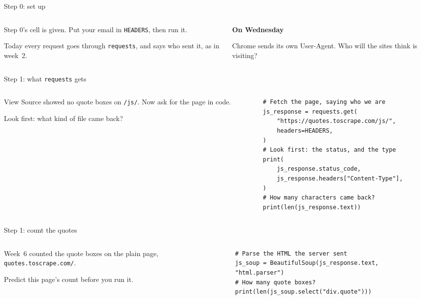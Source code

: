 \documentclass[9pt,aspectratio=169]{beamer}
\begin{document}
\begin{frame}{Step 0: set up}
    \begin{columns}[T]
        \begin{column}{0.6\textwidth}
            Step 0's cell is given. Put your email in \texttt{HEADERS}, then run it.

            \medskip
            Today every request goes through \texttt{requests}, and says who sent it, as in week~2.
        \end{column}
        \begin{column}{0.35\textwidth}
            \textbf{On Wednesday}\\[2pt]
            {\footnotesize Chrome sends its own User-Agent. Who will the sites think is visiting?\par}
        \end{column}
    \end{columns}
\end{frame}

\begin{frame}[fragile]{Step 1: what \texttt{requests} gets}
    \begin{columns}[T]
        \begin{column}{0.37\textwidth}
            View Source showed no quote boxes on \texttt{/js/}. Now ask for the page in code.

            \medskip
            Look first: what kind of file came back?
        \end{column}
        \begin{column}{0.6\textwidth}
\begin{lstlisting}[style=lab]
# Fetch the page, saying who we are
js_response = requests.get(
    "https://quotes.toscrape.com/js/",
    headers=HEADERS,
)
# Look first: the status, and the type
print(
    js_response.status_code,
    js_response.headers["Content-Type"],
)
# How many characters came back?
print(len(js_response.text))
\end{lstlisting}
        \end{column}
    \end{columns}
\end{frame}

\begin{frame}[fragile]{Step 1: count the quotes}
    \begin{columns}[T]
        \begin{column}{0.37\textwidth}
            Week~6 counted the quote boxes on the plain page, \texttt{quotes.toscrape.com/}.

            \medskip
            Predict this page's count before you run it.
        \end{column}
        \pause
        \begin{column}{0.6\textwidth}
\begin{lstlisting}[style=lab]
# Parse the HTML the server sent
js_soup = BeautifulSoup(js_response.text, "html.parser")
# How many quote boxes?
print(len(js_soup.select("div.quote")))
\end{lstlisting}
        \end{column}
    \end{columns}
\end{frame}
\end{document}
